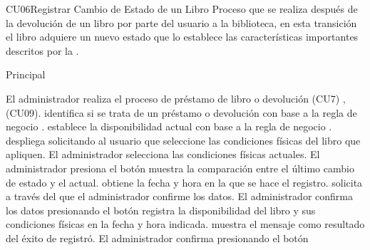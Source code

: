 
	\begin{UseCase}{CU06}{Registrar Cambio de Estado de un Libro}{
		Proceso que se realiza después de la devolución  de un libro por parte del usuario a la biblioteca, en esta transición el libro adquiere un nuevo estado que lo establece las  características importantes descritos por la .
	}
	\end{UseCase}
	\begin{UCtrayectoria}{Principal}

	\UCpaso[\UCactor] El administrador realiza el proceso de préstamo de libro o devolución  \UCref(CU7) , \UCref(CU09).
	\UCpaso[\UCsist]   identifica si se trata de un préstamo o devolución con base a la regla de negocio .
 	\UCpaso[\UCsist]  establece la disponibilidad actual con base a la regla de negocio   .
	\UCpaso[\UCsist] despliega  solicitando al usuario que seleccione las  condiciones físicas del libro que apliquen.
	\UCpaso[\UCactor]El administrador selecciona las condiciones físicas actuales.
	\UCpaso[\UCactor] El administrador presiona el botón 
	\UCpaso[\UCsist]  muestra la comparación entre el último cambio de estado y el actual.
	\UCpaso[\UCsist] obtiene la fecha y hora en la que se hace el registro.
	\UCpaso[\UCsist] solicita a través del   que el administrador confirme los datos.
	\UCpaso[\UCactor] El administrador confirma los datos presionando el botón  
	\UCpaso[\UCsist] registra la  disponibilidad del libro y sus condiciones físicas en la 			fecha y hora indicada.
	\UCpaso[\UCsist] muestra el mensaje  como resultado del éxito de registró.
	\UCpaso[\UCactor] El administrador confirma presionando el botón  
			
	\end{UCtrayectoria}		
			
